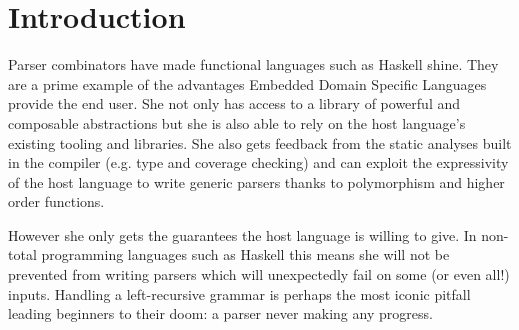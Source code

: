 \documentclass[sigplan,review,anonymous]{acmart}\settopmatter{printfolios=true}
\begin{document}
\begin{CCSXML}
\end{CCSXML}





\maketitle


\section{Introduction}

Parser combinators have made functional languages such as Haskell
shine. They are a prime example of the advantages Embedded Domain
Specific Languages provide the end user. She not only has access
to a library of powerful and composable abstractions but she is also
able to rely on the host language's existing tooling and libraries.
She also gets feedback from the static analyses built in the compiler
(e.g. type and coverage checking) and can exploit the expressivity
of the host language to write generic parsers thanks to polymorphism
and higher order functions.

However she only gets the guarantees the host language is willing
to give. In non-total programming languages such as Haskell this
means she will not be prevented from writing parsers which will
unexpectedly fail on some (or even all!) inputs. Handling a
left-recursive grammar is perhaps the most iconic pitfall leading
beginners to their doom: a parser never making any progress.
\end{document}

